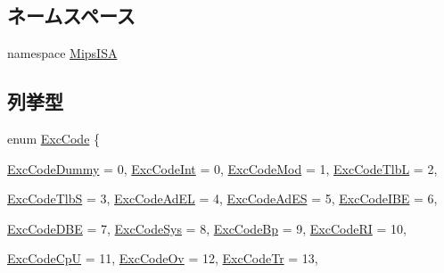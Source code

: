 \subsection*{ネームスペース}
\begin{DoxyCompactItemize}
\item 
namespace \hyperlink{namespaceMipsISA}{MipsISA}
\end{DoxyCompactItemize}
\subsection*{列挙型}
\begin{DoxyCompactItemize}
\item 
enum \hyperlink{namespaceMipsISA_abcc8a7c57cd8becefbfd621dbff5ffd4}{ExcCode} \{ \par
\hyperlink{namespaceMipsISA_abcc8a7c57cd8becefbfd621dbff5ffd4ae755cb1bc5837466d3b27bd12b5c06b3}{ExcCodeDummy} =  0, 
\hyperlink{namespaceMipsISA_abcc8a7c57cd8becefbfd621dbff5ffd4a3c943598c12d27984a15e1af7b4aa238}{ExcCodeInt} =  0, 
\hyperlink{namespaceMipsISA_abcc8a7c57cd8becefbfd621dbff5ffd4a22ded6b1dd00d5387929ac2d357e0c62}{ExcCodeMod} =  1, 
\hyperlink{namespaceMipsISA_abcc8a7c57cd8becefbfd621dbff5ffd4aead7e6d68e9e4bb0b9da34c0639c7574}{ExcCodeTlbL} =  2, 
\par
\hyperlink{namespaceMipsISA_abcc8a7c57cd8becefbfd621dbff5ffd4a5b4d5d68f22c53c153e4043d7814eeb4}{ExcCodeTlbS} =  3, 
\hyperlink{namespaceMipsISA_abcc8a7c57cd8becefbfd621dbff5ffd4a88c8626de76621519043428a669f8428}{ExcCodeAdEL} =  4, 
\hyperlink{namespaceMipsISA_abcc8a7c57cd8becefbfd621dbff5ffd4abedfbe894e97dcc3af2409032d2f41a0}{ExcCodeAdES} =  5, 
\hyperlink{namespaceMipsISA_abcc8a7c57cd8becefbfd621dbff5ffd4aa6c6e25047e2925aa1dac5fb15016ba1}{ExcCodeIBE} =  6, 
\par
\hyperlink{namespaceMipsISA_abcc8a7c57cd8becefbfd621dbff5ffd4a85f2ac2cb1fdd0c42a93e51ed4246189}{ExcCodeDBE} =  7, 
\hyperlink{namespaceMipsISA_abcc8a7c57cd8becefbfd621dbff5ffd4af3d90d688c82f9748f512de065d11867}{ExcCodeSys} =  8, 
\hyperlink{namespaceMipsISA_abcc8a7c57cd8becefbfd621dbff5ffd4a7b3697d781cd0db707834b2bb53bd827}{ExcCodeBp} =  9, 
\hyperlink{namespaceMipsISA_abcc8a7c57cd8becefbfd621dbff5ffd4ac4e1012c7a50bac4f77659aa1d74f7b6}{ExcCodeRI} =  10, 
\par
\hyperlink{namespaceMipsISA_abcc8a7c57cd8becefbfd621dbff5ffd4a551171a5da226246b5531b81b1b004d1}{ExcCodeCpU} =  11, 
\hyperlink{namespaceMipsISA_abcc8a7c57cd8becefbfd621dbff5ffd4a03cfe0fdb20fb915a732611a1fb1fcd6}{ExcCodeOv} =  12, 
\hyperlink{namespaceMipsISA_abcc8a7c57cd8becefbfd621dbff5ffd4a44790335bbdd6c0676c33451ea06cab8}{ExcCodeTr} =  13, 

\end{DoxyCompactItemize}

